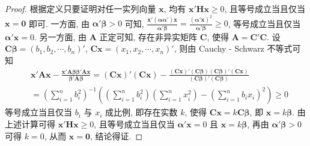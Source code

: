 \documentclass[../../main.tex]{subfiles}%
\begin{document}
\begin{proof}
根据定义只要证明对任一实列向量 \(\boldsymbol{x}\), 均有 \(\boldsymbol{x}'\boldsymbol{H}\boldsymbol{x}\geqslant 0\), 且等号成立当且仅当 \(\boldsymbol{x}=\boldsymbol{0}\) 即可. 一方面, 由 \(\boldsymbol{\alpha}'\boldsymbol{\beta}>0\) 可知, \(\frac{\boldsymbol{x}'(\boldsymbol{\alpha}\boldsymbol{\alpha}')\boldsymbol{x}}{\boldsymbol{\alpha}'\boldsymbol{\beta}}=\frac{(\boldsymbol{\alpha}'\boldsymbol{x})^2}{\boldsymbol{\alpha}'\boldsymbol{\beta}}\geqslant 0\), 等号成立当且仅当 \(\boldsymbol{\alpha}'\boldsymbol{x}=0\). 另一方面, 由 \(\boldsymbol{A}\) 正定可知, 存在非异实矩阵 \(\boldsymbol{C}\), 使得 \(\boldsymbol{A}=\boldsymbol{C}'\boldsymbol{C}\). 设 \(\boldsymbol{C}\boldsymbol{\beta}=(b_1,b_2,\cdots,b_n)'\), \(\boldsymbol{C}\boldsymbol{x}=(x_1,x_2,\cdots,x_n)'\), 则由 Cauchy - Schwarz 不等式可知
\begin{align*}
&\boldsymbol{x}'\boldsymbol{A}\boldsymbol{x}-\frac{\boldsymbol{x}'\boldsymbol{A}\boldsymbol{\beta}\boldsymbol{\beta}'\boldsymbol{A}\boldsymbol{x}}{\boldsymbol{\beta}'\boldsymbol{A}\boldsymbol{\beta}}=(\boldsymbol{C}\boldsymbol{x})'(\boldsymbol{C}\boldsymbol{x})-\frac{(\boldsymbol{C}\boldsymbol{x})'(\boldsymbol{C}\boldsymbol{\beta})(\boldsymbol{C}\boldsymbol{\beta})'(\boldsymbol{C}\boldsymbol{x})}{(\boldsymbol{C}\boldsymbol{\beta})'(\boldsymbol{C}\boldsymbol{\beta})}\\
&=\left(\sum_{i = 1}^{n}b_i^2\right)^{-1}\left(\left(\sum_{i = 1}^{n}b_i^2\right)\left(\sum_{i = 1}^{n}x_i^2\right)-\left(\sum_{i = 1}^{n}b_ix_i\right)^2\right)\geqslant 0
\end{align*}
等号成立当且仅当 \(b_i\) 与 \(x_i\) 成比例, 即存在实数 \(k\), 使得 \(\boldsymbol{C}\boldsymbol{x}=k\boldsymbol{C}\boldsymbol{\beta}\), 即 \(\boldsymbol{x}=k\boldsymbol{\beta}\). 由上述计算可得 \(\boldsymbol{x}'\boldsymbol{H}\boldsymbol{x}\geqslant 0\), 且等号成立当且仅当 \(\boldsymbol{\alpha}'\boldsymbol{x}=0\) 且 \(\boldsymbol{x}=k\boldsymbol{\beta}\), 再由 \(\boldsymbol{\alpha}'\boldsymbol{\beta}>0\) 可得 \(k = 0\), 从而 \(\boldsymbol{x}=\boldsymbol{0}\), 结论得证. 
\end{proof}
\end{document}
